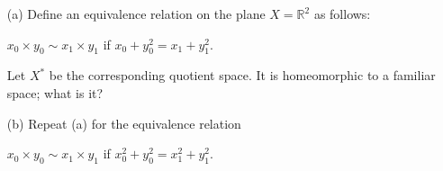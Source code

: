   \begin{exercise}[Munkres 22.4]
    \begin{enumerate}
      \item[(a)] Define an equivalence relation on the plane $X = \mathbb{R}^2$ as follows:
      \begin{center}
        $x_0 \times y_0 \sim x_1 \times y_1$ \quad if $x_0 + y_0^2 = x_1 + y_1^2$.
      \end{center}
      Let $X^*$ be the corresponding quotient space. It is homeomorphic to a familiar
      space; what is it? 
      
      \item[(b)] Repeat (a) for the equivalence relation
      \begin{center}
        $x_0 \times y_0 \sim x_1 \times y_1$ \quad if $x_0^2 + y_0^2 = x_1^2 + y_1^2$.
      \end{center}
    \end{enumerate}
  \end{exercise}
